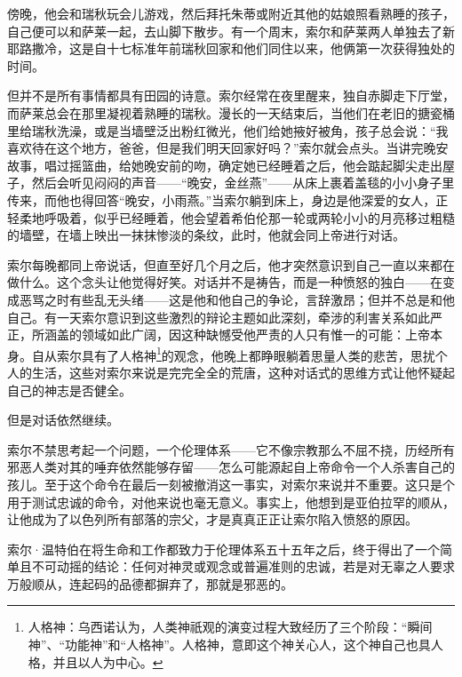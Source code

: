 \documentclass[AutoFakeBold=true]{book}
\begin{document}
傍晚，他会和瑞秋玩会儿游戏，然后拜托朱蒂或附近其他的姑娘照看熟睡的孩子，自己便可以和萨莱一起，去山脚下散步。有一个周末，索尔和萨莱两人单独去了新耶路撒冷，这是自十七标准年前瑞秋回家和他们同住以来，他俩第一次获得独处的时间。

但并不是所有事情都具有田园的诗意。索尔经常在夜里醒来，独自赤脚走下厅堂，而萨莱总会在那里凝视着熟睡的瑞秋。漫长的一天结束后，当他们在老旧的搪瓷桶里给瑞秋洗澡，或是当墙壁泛出粉红微光，他们给她掖好被角，孩子总会说：``我喜欢待在这个地方，爸爸，但是我们明天回家好吗？''索尔就会点头。当讲完晚安故事，唱过摇篮曲，给她晚安前的吻，确定她已经睡着之后，他会踮起脚尖走出屋子，然后会听见闷闷的声音——``晚安，金丝燕''——从床上裹着盖毯的小小身子里传来，而他也得回答``晚安，小雨燕。''当索尔躺到床上，身边是他深爱的女人，正轻柔地呼吸着，似乎已经睡着，他会望着希伯伦那一轮或两轮小小的月亮移过粗糙的墙壁，在墙上映出一抹抹惨淡的条纹，此时，他就会同上帝进行对话。

索尔每晚都同上帝说话，但直至好几个月之后，他才突然意识到自己一直以来都在做什么。这个念头让他觉得好笑。对话并不是祷告，而是一种愤怒的独白——在变成恶骂之时有些乱无头绪——这是他和他自己的争论，言辞激昂；但并不总是和他自己。有一天索尔意识到这些激烈的辩论主题如此深刻，牵涉的利害关系如此严正，所涵盖的领域如此广阔，因这种缺憾受他严责的人只有惟一的可能：上帝本身。自从索尔具有了人格神\footnote{人格神：乌西诺认为，人类神祇观的演变过程大致经历了三个阶段：``瞬间神''、``功能神''和``人格神''。人格神，意即这个神关心人，这个神自己也具人格，并且以人为中心。}的观念，他晚上都睁眼躺着思量人类的悲苦，思扰个人的生活，这些对索尔来说是完完全全的荒唐，这种对话式的思维方式让他怀疑起自己的神志是否健全。

但是对话依然继续。

索尔不禁思考起一个问题，一个伦理体系——它不像宗教那么不屈不挠，历经所有邪恶人类对其的唾弃依然能够存留——怎么可能源起自上帝命令一个人杀害自己的孩儿。至于这个命令在最后一刻被撤消这一事实，对索尔来说并不重要。这只是个用于测试忠诚的命令，对他来说也毫无意义。事实上，他想到是亚伯拉罕的顺从，让他成为了以色列所有部落的宗父，才是真真正正让索尔陷入愤怒的原因。

索尔·温特伯在将生命和工作都致力于伦理体系五十五年之后，终于得出了一个简单且不可动摇的结论：任何对神灵或观念或普遍准则的忠诚，若是对无辜之人要求万般顺从，连起码的品德都摒弃了，那就是邪恶的。
\end{document}
